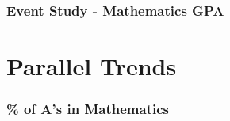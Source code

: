 \documentclass{beamer}
\begin{document}
\begin{frame}
    \label{update_scott}
    \frametitle{Event Study - Mathematics GPA}
        {
    }
\end{frame}





\section{Parallel Trends}

\begin{frame}
    \label{update_scott}
    \frametitle{\% of A's in Mathematics}
        {
    }
\end{frame}
\end{document}

